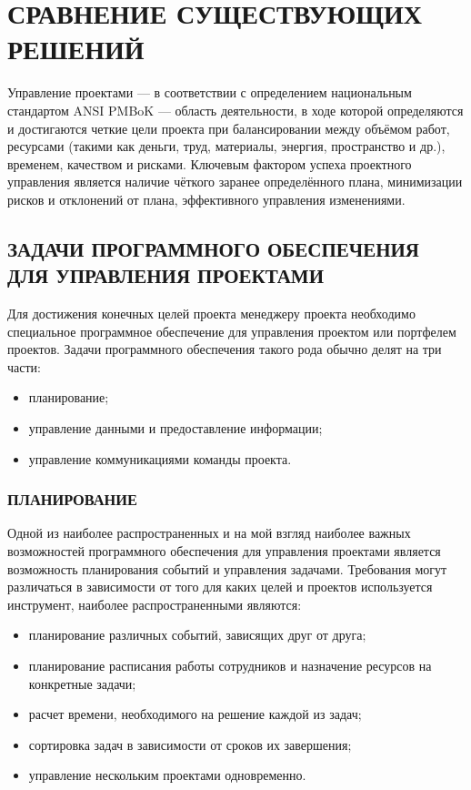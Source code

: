 \documentclass[14pt, a4paper]{extreport}
\begin{document}
\chapter{\MakeTextUppercase{Сравнение существующих решений}}
Управление проектами --- в соответствии с определением национальным стандартом
ANSI PMBoK — область деятельности, в ходе которой определяются и достигаются
четкие цели проекта при балансировании между объёмом работ, ресурсами 
(такими как деньги, труд, материалы, энергия, пространство и др.), временем, качеством и рисками. 
Ключевым фактором успеха проектного управления является наличие чёткого заранее определённого плана,
минимизации рисков и отклонений от плана, эффективного управления изменениями.~\cite{wiki_pm}

\section{\MakeTextUppercase{Задачи программного обеспечения для управления проектами}}
Для достижения конечных целей проекта менеджеру проекта необходимо специальное программное обеспечение
для управления проектом или портфелем проектов.
Задачи программного обеспечения такого рода обычно делят на три части:
\begin{itemize}
  \item планирование;
  \item управление данными и предоставление информации;
  \item управление коммуникациями команды проекта.
\end{itemize}

\subsection{\MakeTextUppercase{Планирование}}
Одной из наиболее распространенных и на мой взгляд наиболее важных возможностей
программного обеспечения для управления проектами является возможность планирования
событий и управления задачами. Требования могут различаться в зависимости от того
для каких целей и проектов используется инструмент, наиболее распространенными являются:
\begin{itemize}
  \item планирование различных событий, зависящих друг от друга;
  \item планирование расписания работы сотрудников и назначение ресурсов на конкретные задачи;
  \item расчет времени, необходимого на решение каждой из задач;
  \item сортировка задач в зависимости от сроков их завершения;
  \item управление нескольким проектами одновременно.
\end{itemize}
\end{document}
